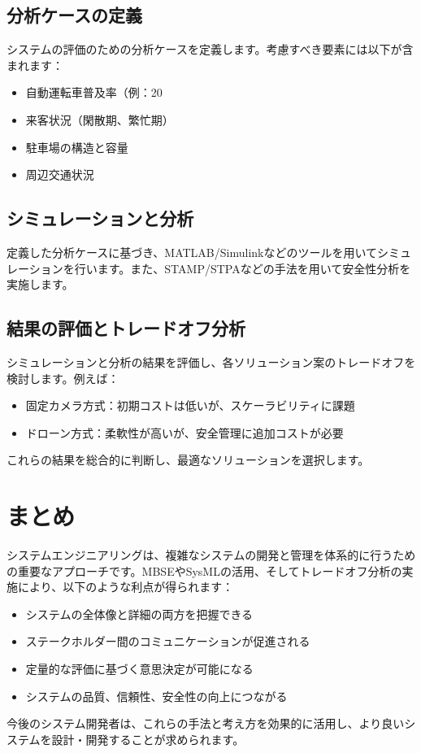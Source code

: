\subsection{分析ケースの定義}

システムの評価のための分析ケースを定義します。考慮すべき要素には以下が含まれます：

\begin{itemize}
    \item 自動運転車普及率（例：20%
    \item 来客状況（閑散期、繁忙期）
    \item 駐車場の構造と容量
    \item 周辺交通状況
\end{itemize}

\subsection{シミュレーションと分析}

定義した分析ケースに基づき、MATLAB/Simulinkなどのツールを用いてシミュレーションを行います。また、STAMP/STPAなどの手法を用いて安全性分析を実施します。

\subsection{結果の評価とトレードオフ分析}

シミュレーションと分析の結果を評価し、各ソリューション案のトレードオフを検討します。例えば：

\begin{itemize}
    \item 固定カメラ方式：初期コストは低いが、スケーラビリティに課題
    \item ドローン方式：柔軟性が高いが、安全管理に追加コストが必要
\end{itemize}

これらの結果を総合的に判断し、最適なソリューションを選択します。

\section{まとめ}

システムエンジニアリングは、複雑なシステムの開発と管理を体系的に行うための重要なアプローチです。MBSEやSysMLの活用、そしてトレードオフ分析の実施により、以下のような利点が得られます：

\begin{itemize}
    \item システムの全体像と詳細の両方を把握できる
    \item ステークホルダー間のコミュニケーションが促進される
    \item 定量的な評価に基づく意思決定が可能になる
    \item システムの品質、信頼性、安全性の向上につながる
\end{itemize}

今後のシステム開発者は、これらの手法と考え方を効果的に活用し、より良いシステムを設計・開発することが求められます。

